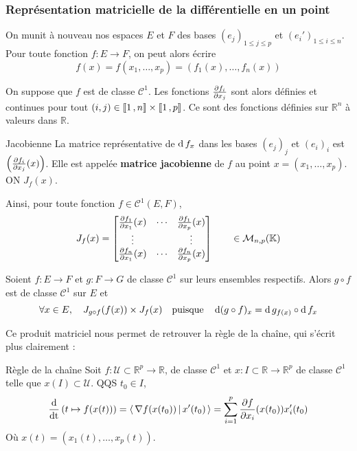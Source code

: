     \subsubsection{Représentation matricielle de la différentielle en un point}

    On munit à nouveau nos espaces $E$ et $F$ des bases $(e_j)_{1 \leq j \leq p}$ et $(e_i')_{1 \leq i \leq n}$. Pour toute fonction $f : E \to F$, on peut alors écrire
    \[ f(x) = f(x_1,\ldots,x_p) = (f_1(x), \ldots, f_n(x)) \] 
    
    On suppose que $f$ est de classe $\mathcal{C}^1$. Les fonctions $\frac{\partial f_i}{\partial x_j}$ sont alors définies et continues pour tout $(i,j) \in \left\llbracket 1 \, , n \right\rrbracket \times \left\llbracket 1 \, , p \right\rrbracket$. Ce sont des fonctions définies sur $\mathbb{R}^n$ à valeurs dans $\mathbb{R}$. 

    \begin{defitheo}{Jacobienne}{}
        La matrice représentative de $\operatorname{d} f_x$ dans les bases $(e_j)_j$ et $(e_i)_i$ est $\left(\frac{\partial f_i}{\partial x_j}(x)\right)$. Elle est appelée \textbf{matrice jacobienne} de $f$ au point $x = (x_1,\ldots,x_p)$. ON $J_f(x)$. 
    \end{defitheo}

    Ainsi, pour toute fonction $f \in \mathcal{C}^1(E,F)$, 
    \[ J_f(x) = \begin{bmatrix}
        \frac{\partial f_1}{\partial x_1}(x) & \cdots & \frac{\partial f_1}{\partial x_p}(x) \\
        \vdots & & \vdots \\
        \frac{\partial f_n}{\partial x_1}(x) & \cdots & \frac{\partial f_n}{\partial x_p}(x)
    \end{bmatrix} \qquad \in \mathcal{M}_{n,p}(\mathbb{K}) \]   

    Soient $f : E \to F$ et $g : F \to G$ de classe $\mathcal{C}^1$ sur leurs ensembles respectifs. Alors $g \circ f$ est de classe $\mathcal{C}^1$ sur $E$ et 
    \[ \forall x \in E, \quad J_{g \circ f}(f(x)) \times J_f(x) \quad \text{puisque} \quad \operatorname{d} (g \circ f)_x = \operatorname{d} g_{f(x)} \circ \operatorname{d} f_x \]   

    Ce produit matriciel nous permet de retrouver la règle de la chaîne, qui s’écrit plus clairement :

    \begin{theo}{Règle de la chaîne}{}
        Soit $f : \mathcal{U} \subset \mathbb{R}^p \to \mathbb{R}$, de classe $\mathcal{C}^1$ et $x : I \subset \mathbb{R} \to \mathbb{R}^p$ de classe $\mathcal{C}^1$ telle que $x(I) \subset \mathcal{U}$. QQS $t_0 \in I$, 
        \[ \frac{\operatorname{d}}{\text{dt}}\left(t \mapsto f(x(t))\right) = \left<\,\nabla f (x(t_0))\,\middle|\,x'(t_0)\,\right> = \sum_{i=1}^{p} \frac{\partial f}{\partial x_i}(x(t_0)) x_i'(t_0) \]   
        Où $x(t) = (x_1(t), \ldots, x_p(t))$.
    \end{theo}

